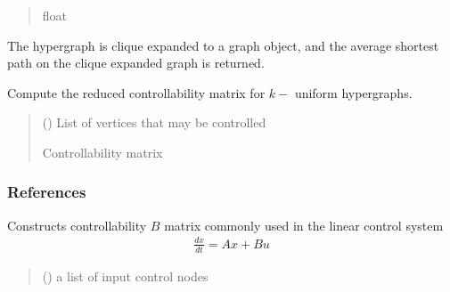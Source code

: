 \documentclass[letterpaper,10pt,english]{sphinxmanual}
\begin{document}
\begin{fulllineitems}
\begin{fulllineitems}
\begin{quote}
\begin{description}
\sphinxAtStartPar
float

\end{description}\end{quote}

\sphinxAtStartPar
The hypergraph is clique expanded to a graph object, and the average shortest path on
the clique expanded graph is returned.

\end{fulllineitems}


\begin{fulllineitems}
\label{\detokenize{HAT:HAT.Hypergraph.Hypergraph.ctrbk}}
\pysigstartsignatures
{}
\pysigstopsignatures
\sphinxAtStartPar
Compute the reduced controllability matrix for \(k-\) uniform hypergraphs.
\begin{quote}\begin{description}
\sphinxAtStartPar
{} () \textendash{} List of vertices that may be controlled

\sphinxAtStartPar
Controllability matrix

\sphinxAtStartPar
{}

\end{description}\end{quote}
\subsubsection*{References}

\end{fulllineitems}


\begin{fulllineitems}
\label{\detokenize{HAT:HAT.Hypergraph.Hypergraph.bMatrix}}
\pysigstartsignatures
{}
\pysigstopsignatures
\sphinxAtStartPar
Constructs controllability \(B\) matrix commonly used in the linear control system
\begin{equation*}
\begin{split}\frac{dx}{dt} = Ax+Bu\end{split}
\end{equation*}\begin{quote}\begin{description}
\sphinxAtStartPar
{} () \textendash{} a list of input control nodes


\end{description}
\end{quote}
\end{fulllineitems}
\end{fulllineitems}
\end{document}
